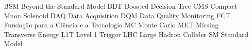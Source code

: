 
 {BSM} {Beyond the Standard Model}
 {BDT} {Boosted Decision Tree}
 {CMS} {Compact Muon Solenoid}
 {DAQ} {Data Acquisition}
 {DQM} {Data Quality Monitoring}
 {FCT} {Fundação para a Ciência e a Tecnologia}
  {MC}  {Monte Carlo}
 {MET} {Missing Transverse Energy}
 {L1T} {Level 1 Trigger}
 {LHC} {Large Hadron Collider}
  {SM}  {Standard Model}

